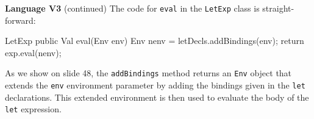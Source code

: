 \begin{minipage}[t]{\sw}
\slidenumber
\LARGE
{\bf Language V3} (continued)\exx
\Large
\emm{}\exx
\LARGE
The code for \verb'eval' in the \verb'LetExp' class is straight-forward:
\Large
\begin{qv}
LetExp
    public Val eval(Env env) {
        Env nenv = letDecls.addBindings(env);
        return exp.eval(nenv);
    }
\end{qv}
\LARGE
As we show on slide 48,
the \verb'addBindings' method returns an \verb'Env' object
that extends the \verb'env' environment parameter
by adding the bindings given in the \verb'let' declarations.
This extended environment is then used
to evaluate the body of the \verb'let' expression.
\end{minipage}

